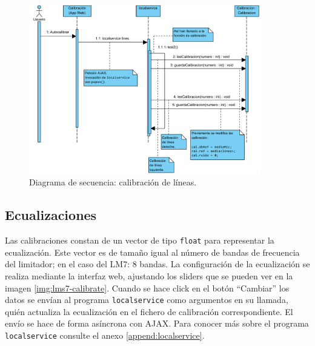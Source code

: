 \begin{figure}[h]
    \centering
    \includegraphics[width=0.9\textwidth]{figuras/lms7-calibrate-lines.pdf}
    \caption{Diagrama de secuencia: calibración de líneas.}
    \label{fig:lms7-calibrate-lines}
\end{figure}

\subsection{Ecualizaciones}

Las calibraciones constan de un vector de tipo \verb|float| para representar la ecualización. Este vector es de tamaño igual al número de bandas de frecuencia del limitador; en el caso del \acrshort{LM7}: 8 bandas. La configuración de la ecualización se realiza mediante la interfaz web, ajustando los sliders que se pueden ver en la imagen \ref{img:lms7-calibrate}. Cuando se hace click en el botón ``Cambiar'' los datos se envían al programa \verb|localservice| como argumentos en su llamada, quién actualiza la ecualización en el fichero de calibración correspondiente. El envío se hace de forma asíncrona con AJAX. Para conocer más sobre el programa \verb|localservice| consulte el anexo \ref{append:localservice}.


